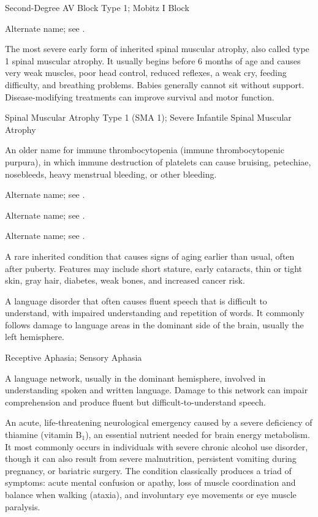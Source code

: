 \synonyms
Second-Degree AV Block Type 1; Mobitz I Block

 Alternate name; see .

 The most severe early form of inherited spinal muscular atrophy, also called type 1 spinal muscular atrophy. It usually begins before 6 months of age and causes very weak muscles, poor head control, reduced reflexes, a weak cry, feeding difficulty, and breathing problems. Babies generally cannot sit without support. Disease-modifying treatments can improve survival and motor function.

\synonyms
Spinal Muscular Atrophy Type 1 (SMA 1); Severe Infantile Spinal Muscular Atrophy

 An older name for immune thrombocytopenia (immune thrombocytopenic purpura), in which immune destruction of platelets can cause bruising, petechiae, nosebleeds, heavy menstrual bleeding, or other bleeding.

 Alternate name; see .

 Alternate name; see .

 Alternate name; see .

 A rare inherited condition that causes signs of aging earlier than usual, often after puberty. Features may include short stature, early cataracts, thin or tight skin, gray hair, diabetes, weak bones, and increased cancer risk.

 A language disorder that often causes fluent speech that is difficult to understand, with impaired understanding and repetition of words. It commonly follows damage to language areas in the dominant side of the brain, usually the left hemisphere.

\synonyms
Receptive Aphasia; Sensory Aphasia

 A language network, usually in the dominant hemisphere, involved in understanding spoken and written language. Damage to this network can impair comprehension and produce fluent but difficult-to-understand speech.

 An acute, life-threatening neurological emergency caused by a severe deficiency of thiamine (vitamin $\text{B}_1$), an essential nutrient needed for brain energy metabolism. It most commonly occurs in individuals with severe chronic alcohol use disorder, though it can also result from severe malnutrition, persistent vomiting during pregnancy, or bariatric surgery. The condition classically produces a triad of symptoms: acute mental confusion or apathy, loss of muscle coordination and balance when walking (ataxia), and involuntary eye movements or eye muscle paralysis.

